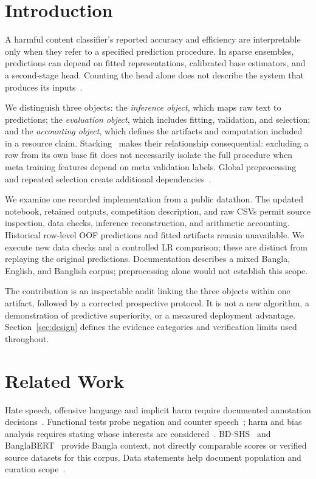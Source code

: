 \documentclass[doublecolumn]{ijcvsplatex}
\newif\ifNamedCase
\newcommand{\CompetitionName}{\ifNamedCase the HerWILL AI for Digital Safety Datathon 2026\else a public datathon\fi}
\begin{document}
\section{Introduction}
\label{sec:introduction}

A harmful content classifier's reported accuracy and efficiency are interpretable only when they refer to a specified prediction procedure. In sparse ensembles, predictions can depend on fitted representations, calibrated base estimators, and a second-stage head. Counting the head alone does not describe the system that produces its inputs~\cite{schwartz2020greenai}.

We distinguish three objects: the \emph{inference object}, which maps raw text to predictions; the \emph{evaluation object}, which includes fitting, validation, and selection; and the \emph{accounting object}, which defines the artifacts and computation included in a resource claim. Stacking~\cite{wolpert1992stacked} makes their relationship consequential: excluding a row from its own base fit does not necessarily isolate the full procedure when meta training features depend on meta validation labels. Global preprocessing and repeated selection create additional dependencies~\cite{varma2006bias,cawley2010overfitting,kapoor2023leakage}.

We examine one recorded implementation from \CompetitionName. \ifNamedCase The supplied competition description is cited as an operational source~\cite{herwill2026materials}.\fi The updated notebook, retained outputs, competition description, and raw CSVs permit source inspection, data checks, inference reconstruction, and arithmetic accounting. Historical row-level OOF predictions and fitted artifacts remain unavailable. We execute new data checks and a controlled LR comparison; these are distinct from replaying the original predictions. Documentation describes a mixed Bangla, English, and Banglish corpus; preprocessing alone would not establish this scope.

The contribution is an inspectable audit linking the three objects within one artifact, followed by a corrected prospective protocol. It is not a new algorithm, a demonstration of predictive superiority, or a measured deployment advantage. Section~\ref{sec:design} defines the evidence categories and verification limits used throughout.

\section{Related Work}
\label{sec:related}
Hate speech, offensive language and implicit harm require documented annotation decisions~\cite{davidson2017automated}. Functional tests probe negation and counter speech~\cite{rottger2021hatecheck}; harm and bias analysis requires stating whose interests are considered~\cite{blodgett2020language}. BD-SHS~\cite{romim2022bdshs} and BanglaBERT~\cite{bhattacharjee2022banglabert} provide Bangla context, not directly comparable scores or verified source datasets for this corpus. Data statements help document population and curation scope~\cite{bender2018datastatements}.
\end{document}
